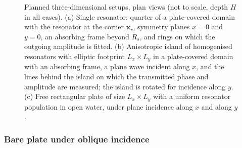 {\begin{figure}[t]
    \caption{Planned three-dimensional setups, plan views (not to scale, depth $H$ in all cases). (a) Single resonator: quarter of a plate-covered domain with the resonator at the corner $\boldsymbol{x}_r$, symmetry planes $x=0$ and $y=0$, an absorbing frame beyond $R_s$, and rings on which the outgoing amplitude is fitted. (b) Anisotropic island of homogenised resonators with elliptic footprint $L_x\times L_y$ in a plate-covered domain with an absorbing frame, a plane wave incident along $x$, and the lines behind the island on which the transmitted phase and amplitude are measured; the island is rotated for incidence along $y$. (c) Free rectangular plate of size $L_x\times L_y$ with a uniform resonator population in open water, under plane incidence along $x$ and along $y$.}
    \label{fig:num_sketch_3D_planned}
\end{figure}

\subsubsection{Bare plate under oblique incidence}\label{subsubsec:num_L3_1}

}
